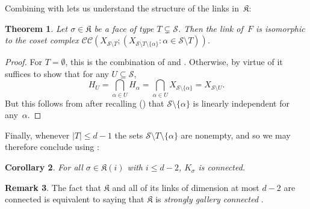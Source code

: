 \documentclass[10pt,a4paper]{article}
\newtheorem{theorem}{Theorem}[section]
\newtheorem{corollary}[theorem]{Corollary}
\theoremstyle{definition}
\newtheorem{remark}[theorem]{Remark}
\newcommand{\F}{\mathbbm F}
\newcommand{\ol}[1]{\overline{#1}}
\newcommand{\calS}{\mathcal{S}}
\newcommand{\CC}[2]{\mathcal{C}\mathcal{C}(#1;#2)}
\newcommand{\Esc}[2]{\ol{\mathrm{G}}(#1,#2)}
\newcommand{\complex}{\mathfrak{K}}
\begin{document}
Combining  with  lets us understand the structure of the links in~$\complex$:
\begin{theorem} \label{thm:linkstruct}
    Let $\sigma \in \complex$ be a face of type $T \subsetneq \calS$.
    Then the link of~$F$ is isomorphic to the coset complex $\CC{X_{\calS \setminus T}}{(X_{\calS \setminus T \setminus \{\alpha\}} : \alpha \in \calS \setminus T)}$.
\end{theorem}
\begin{proof}
    For $T = \emptyset$, this is the combination of  and .  Otherwise, by virtue of  it suffices to show that for any $U \subseteq \calS$,
    \[
        H_U = \bigcap_{\alpha \in U} H_\alpha =  \bigcap_{\alpha \in U} X_{\calS \setminus \{\alpha\}} = X_{\calS \setminus U}.
    \]
    But this follows from  after recalling () that $\calS \setminus \{\alpha\}$ is linearly independent for any~$\alpha$.
\end{proof}

Finally, whenever $|T| \leq d-1$ the sets $\calS \setminus T \setminus \{\alpha\}$ are nonempty, and so we may therefore conclude using :
\begin{corollary}\label{cor:connectedlinks}
    For all $\sigma \in \complex(i)$ with $i \le d-2$, $K_\sigma$ is connected.
\end{corollary}

\begin{remark}
The fact that $\complex$ and all of its links of dimension at most $d-2$ are connected is equivalent to saying that $\complex$ is \emph{strongly gallery connected} \cite[Rem.~2.1]{KO18}.
\end{remark}
\end{document}
